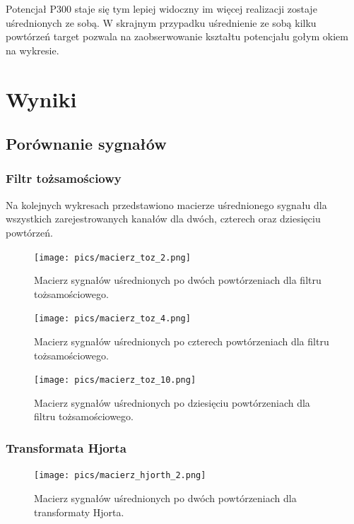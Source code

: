 \documentclass[licencjacka,openright]{pracamgr}
\begin{document}
Potencjał P300 staje się tym lepiej widoczny im więcej realizacji zostaje uśrednionych ze sobą. W skrajnym przypadku uśrednienie ze sobą kilku powtórzeń target pozwala na zaobserwowanie kształtu potencjału gołym okiem na wykresie.


\chapter{Wyniki}
\label{wyniki}
\section{Porównanie sygnałów}
\label{sygnaly}
\subsection{Filtr tożsamościowy}

Na kolejnych wykresach przedstawiono macierze uśrednionego sygnału dla wszystkich zarejestrowanych kanałów dla dwóch, czterech oraz dziesięciu powtórzeń.


\begin{figure}[H]
\centering
\texttt{[image: pics/macierz\_toz\_2.png]}
\caption{Macierz sygnałów uśrednionych po dwóch powtórzeniach dla filtru tożsamościowego.}
\label{maciez_toz_2}
\end{figure}

\begin{figure}[H]
\centering
\texttt{[image: pics/macierz\_toz\_4.png]}
\caption{Macierz sygnałów uśrednionych po czterech powtórzeniach dla filtru tożsamościowego.}
\label{maciez_toz_4}
\end{figure}

\begin{figure}[H]
\centering
\texttt{[image: pics/macierz\_toz\_10.png]}
\caption{Macierz sygnałów uśrednionych po dziesięciu powtórzeniach dla filtru tożsamościowego.}
\label{maciez_toz_10}
\end{figure}

\subsection{Transformata Hjorta}

\begin{figure}[H]
\centering
\texttt{[image: pics/macierz\_hjorth\_2.png]}
\caption{Macierz sygnałów uśrednionych po dwóch powtórzeniach dla transformaty Hjorta.}
\label{maciez_hjorth_2}
\end{figure}
\end{document}
